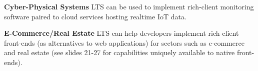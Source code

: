 \begin{frame}{}
{\begin{minipage}{.99\textwidth}
{\begin{enumerate}
\vspace{14pt}
\dmitem \textbf{Cyber-Physical Systems}  \hspace{.5em} 
LTS can be used to implement rich-client monitoring 
software paired to cloud services hosting 
realtime IoT data.

\vspace{14pt}
\dmitem \textbf{E-Commerce/Real Estate}  \hspace{.5em} 
LTS can help developers implement 
rich-client front-ends (as 
alternatives to web applications) for sectors such 
as e-commerce and real estate (see slides 21-27 
for capabilities uniquely available to native front-ends).
\end{enumerate}
}

\end{minipage}
}


\end{frame}
